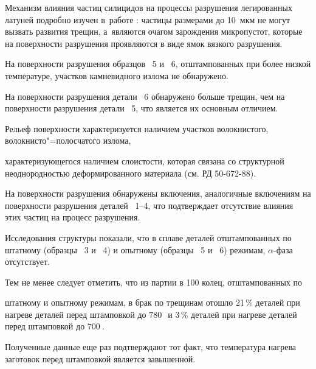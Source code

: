 Механизм влияния частиц силицидов на процессы разрушения легированных латуней подробно изучен в~работе \cite{pugacheva:bib2}: частицы размерами до 10~мкм не могут вызвать развития трещин, а~являются очагом зарождения микропустот, которые на поверхности разрушения проявляются в виде ямок вязкого разрушения.



На поверхности разрушения образцов \No~5 и \No~6, отштампованных при более низкой температуре,  участков камневидного излома не обнаружено. 

На поверхности разрушения детали \No~6 обнаружено больше трещин, чем на поверхности разрушения детали \No~5, что является их основным отличием. 

Рельеф поверхности характеризуется наличием участков волокнистого, волокнисто"=полосчатого излома,

характеризующегося наличием слоистости, которая связана со структурной неоднородностью деформированного материала (см. РД 50-672-88). 

На поверхности разрушения обнаружены включения, аналогичные включениям на поверхности разрушения деталей \No~1--4, что подтверждает отсутствие влияния этих частиц на процесс разрушения.



Исследования структуры показали, что в сплаве деталей отштампованных по штатному (образцы \No~3 и \No~4) и опытному (образцы \No~5 и \No~6) режимам, $\alpha $-фаза отсутствует. 

Тем не менее следует отметить, что из партии в 100 колец, отштампованных по

штатному и опытному режимам, в брак по трещинам отошло 21\,\% деталей при нагреве деталей перед штамповкой до $780~$\textcelsius\ и 3\,\% деталей при нагреве деталей перед штамповкой до $700~$\textcelsius.

Полученные данные еще раз подтверждают тот факт, что температура нагрева заготовок перед штамповкой является завышенной.



\smallskip






